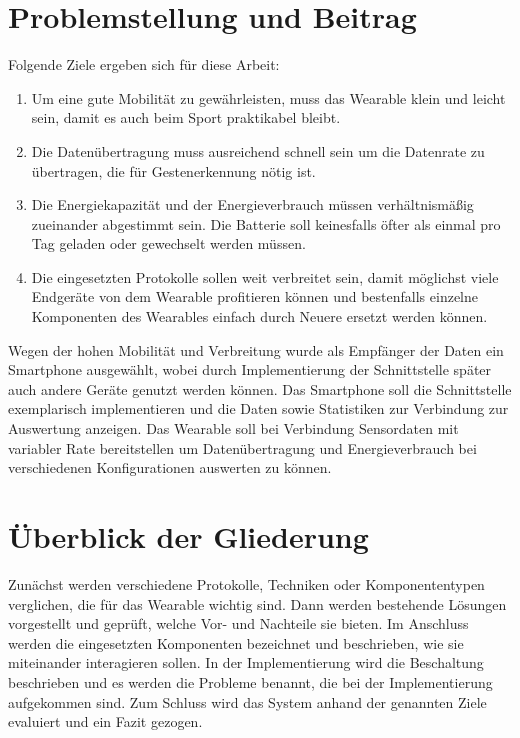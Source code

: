\section{Problemstellung und Beitrag}
Folgende Ziele ergeben sich für diese Arbeit:
\begin{enumerate}
	\item Um eine gute Mobilität zu gewährleisten, muss das Wearable klein und leicht sein, damit es auch beim Sport praktikabel bleibt.
	\item Die Datenübertragung muss ausreichend schnell sein um die Datenrate zu übertragen, die für Gestenerkennung nötig ist.
	\item Die Energiekapazität und der Energieverbrauch müssen verhältnismäßig zueinander abgestimmt sein.
	Die Batterie soll keinesfalls öfter als einmal pro Tag geladen oder gewechselt werden müssen.
	\item Die eingesetzten Protokolle sollen weit verbreitet sein, damit möglichst viele Endgeräte von dem Wearable profitieren können und bestenfalls einzelne Komponenten des Wearables einfach durch Neuere ersetzt werden können.
\end{enumerate}
Wegen der hohen Mobilität und Verbreitung wurde als Empfänger der Daten ein Smartphone ausgewählt, wobei durch Implementierung der Schnittstelle später auch andere Geräte genutzt werden können.
Das Smartphone soll die Schnittstelle exemplarisch implementieren und die Daten sowie Statistiken zur Verbindung zur Auswertung anzeigen.
Das Wearable soll bei Verbindung Sensordaten mit variabler Rate bereitstellen um Datenübertragung und Energieverbrauch bei verschiedenen Konfigurationen auswerten zu können.

\section{Überblick der Gliederung}
Zunächst werden verschiedene Protokolle, Techniken oder Komponententypen verglichen, die für das Wearable wichtig sind.
Dann werden bestehende Lösungen vorgestellt und geprüft, welche Vor- und Nachteile sie bieten.
Im Anschluss werden die eingesetzten Komponenten bezeichnet und beschrieben, wie sie miteinander interagieren sollen.
In der Implementierung wird die Beschaltung beschrieben und es werden die Probleme benannt, die bei der Implementierung aufgekommen sind.
Zum Schluss wird das System anhand der genannten Ziele evaluiert und ein Fazit gezogen.

